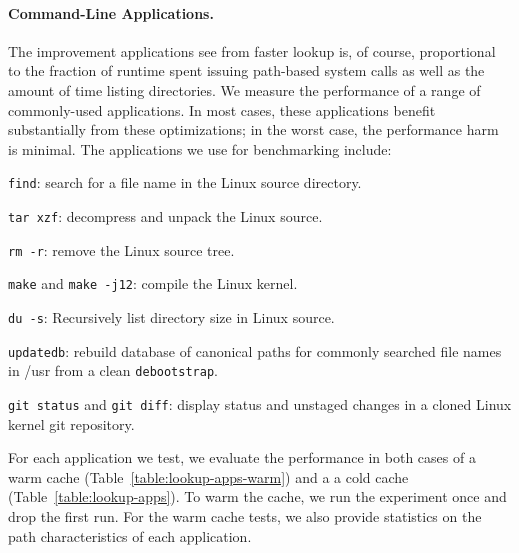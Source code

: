 \paragraph{Command-Line Applications.}
The improvement applications see from faster lookup is, of course, proportional 
to the fraction of runtime spent issuing path-based system calls as well as the amount of time
listing directories.
We measure the performance of a range of commonly-used applications.
In most cases, these applications benefit substantially from these optimizations;
in the worst case, the performance harm is minimal.
The applications we use for benchmarking include:
\begin{compactitem}
\item {\tt find}: search for a file name in the Linux source directory.
\item {\tt tar xzf}: decompress and unpack the Linux source.
\item {\tt rm -r}: remove the Linux source tree.
\item {\tt make} and {\tt make -j12}: compile the Linux kernel.
\item {\tt du -s}: Recursively list directory size in Linux source.
\item {\tt updatedb}: rebuild database of canonical paths for commonly searched file names in /usr from a clean {\tt debootstrap}.
\item {\tt git status} and {\tt git diff}: display status and unstaged changes in a cloned Linux kernel git repository.
\end{compactitem}
For each application we test, we evaluate the performance in both cases of 
a warm cache (Table~\ref{table:lookup-apps-warm}) and a
a cold cache (Table~\ref{table:lookup-apps}).
To warm the cache, we run the experiment once and drop the first run.
For the warm cache tests, we also provide statistics on the path characteristics of each application.


